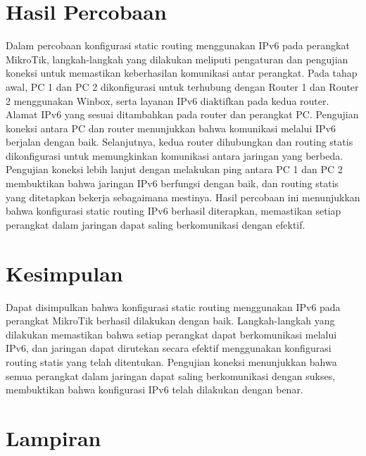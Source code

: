 \section{Hasil Percobaan}
Dalam percobaan konfigurasi static routing menggunakan IPv6 pada perangkat MikroTik, langkah-langkah yang dilakukan meliputi pengaturan dan pengujian koneksi untuk memastikan keberhasilan komunikasi antar perangkat. Pada tahap awal, PC 1 dan PC 2 dikonfigurasi untuk terhubung dengan Router 1 dan Router 2 menggunakan Winbox, serta layanan IPv6 diaktifkan pada kedua router. Alamat IPv6 yang sesuai ditambahkan pada router dan perangkat PC. Pengujian koneksi antara PC dan router menunjukkan bahwa komunikasi melalui IPv6 berjalan dengan baik. Selanjutnya, kedua router dihubungkan dan routing statis dikonfigurasi untuk memungkinkan komunikasi antara jaringan yang berbeda. Pengujian koneksi lebih lanjut dengan melakukan ping antara PC 1 dan PC 2 membuktikan bahwa jaringan IPv6 berfungsi dengan baik, dan routing statis yang ditetapkan bekerja sebagaimana mestinya. Hasil percobaan ini menunjukkan bahwa konfigurasi static routing IPv6 berhasil diterapkan, memastikan setiap perangkat dalam jaringan dapat saling berkomunikasi dengan efektif.

\section{Kesimpulan}
Dapat disimpulkan bahwa konfigurasi static routing menggunakan IPv6 pada perangkat MikroTik berhasil dilakukan dengan baik. Langkah-langkah yang dilakukan memastikan bahwa setiap perangkat dapat berkomunikasi melalui IPv6, dan jaringan dapat dirutekan secara efektif menggunakan konfigurasi routing statis yang telah ditentukan. Pengujian koneksi menunjukkan bahwa semua perangkat dalam jaringan dapat saling berkomunikasi dengan sukses, membuktikan bahwa konfigurasi IPv6 telah dilakukan dengan benar.

\section{Lampiran}

